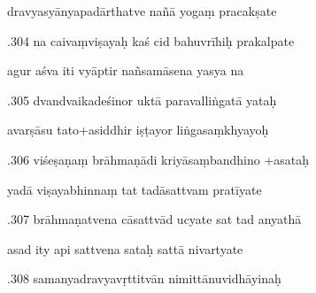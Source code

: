 \documentclass[article,12pt,a4paper]{memoir}%
\newcounter{parCount}
\begin{document}
	  
	  \pstart \leavevmode%
	dravyasyānyapadārthatve nañā yogaṃ pracakṣate 
	{}
	\pend%
      

	  
	  \pstart {}.304 na caivaṃviṣayaḥ kaś cid bahuvrīhiḥ prakalpate 
	{}
	\pend%
      

	  
	  \pstart \leavevmode%
	agur aśva iti vyāptir nañsamāsena yasya na 
	{}
	\pend%
      

	  
	  \pstart {}.305 dvandvaikadeśinor uktā paravalliṅgatā yataḥ 
	{}
	\pend%
      

	  
	  \pstart \leavevmode%
	avarṣāsu tato+asiddhir iṣṭayor liṅgasaṃkhyayoḥ 
	{}
	\pend%
      

	  
	  \pstart {}.306 viśeṣaṇaṃ brāhmaṇādi kriyāsaṃbandhino +asataḥ 
	{}
	\pend%
      

	  
	  \pstart \leavevmode%
	yadā viṣayabhinnaṃ tat tadāsattvam pratīyate 
	{}
	\pend%
      

	  
	  \pstart {}.307 brāhmaṇatvena cāsattvād ucyate sat tad anyathā 
	{}
	\pend%
      

	  
	  \pstart \leavevmode%
	asad ity api sattvena sataḥ sattā nivartyate 
	{}
	\pend%
      

	  
	  \pstart {}.308 samanyadravyavṛttitvān nimittānuvidhāyinaḥ 
	{}
	\pend%
      
\end{document}
